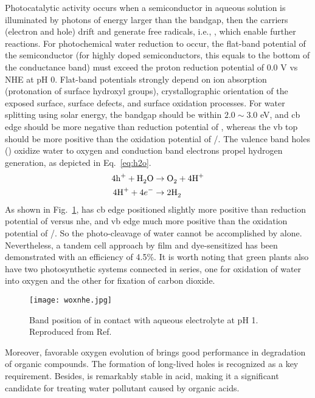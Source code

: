 Photocatalytic activity occurs when a semiconductor in aqueous solution is illuminated by photons of energy larger than the bandgap, then the carriers (electron and hole) drift and generate free radicals, i.e., , which enable further reactions. For photochemical water reduction to occur, the flat-band potential of the semiconductor (for highly doped semiconductors, this equals to the bottom of the conductance band) must exceed the proton reduction potential of 0.0 V vs NHE at pH 0. Flat-band potentials strongly depend on ion absorption (protonation of surface hydroxyl groups), crystallographic orientation of the exposed surface, surface defects, and surface oxidation processes.\cite{Osterloh2008} For water splitting using solar energy, the bandgap should be within $2.0 \sim 3.0 $ eV, and \gls{cb} edge should be more negative than reduction potential of , whereas the \gls{vb} top should be more positive than the oxidation potential of /.\cite{Osterloh2008,Wang2012} The valence band holes () oxidize water to oxygen and conduction band electrons propel hydrogen generation, as depicted in Eq.~\ref{eq:h2o}.
\begin{subequations}\label{eq:h2o}
\begin{align}
4\ce{h^+} +  \ce{H2O} &\rightarrow \ce{O2} + 4\ce{H^+} \label{eq:hervb}\\
4\ce{H^+} +  4e^- &\rightarrow 2\ce{H2} \label{eq:hercb}
\end{align}
\end{subequations}
As shown in Fig.~\ref{fig:woxnhe},  has \gls{cb} edge positioned slightly more positive than reduction potential of  versus \gls{nhe}, and \gls{vb} edge much more positive than the oxidation potential of /. So the photo-cleavage of water cannot be accomplished by  alone. Nevertheless, a tandem cell approach by  film and dye-sensitized  has been demonstrated with an efficiency of 4.5\%.\cite{Michael1999} It is worth noting that green plants also have two photosynthetic systems connected in series, one for oxidation of water into oxygen and the other for fixation of carbon dioxide.
\begin{figure}[htb]
\centering
\texttt{[image: woxnhe.jpg]}
\caption[Band position of  versus NHE]{Band position of  in contact with aqueous electrolyte at pH 1. Reproduced from Ref.\cite{Gratzel2001}}
\label{fig:woxnhe}
\end{figure}
Moreover, favorable oxygen evolution of  brings good performance in degradation of organic compounds.\cite{Hepel2001,Luo2001,Watcharenwong2008} The formation of long-lived holes is recognized as a key requirement.\cite{Pesci2011} Besides,  is remarkably stable in acid, making it a significant candidate for treating water pollutant caused by organic acids.\cite{Monllor-Satoca2006}

